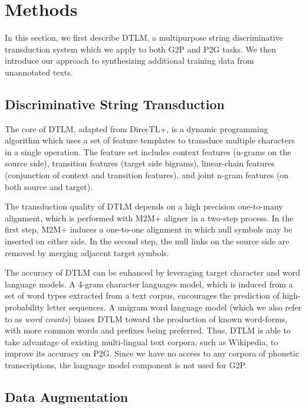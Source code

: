 \documentclass[11pt,a4paper]{article}
\begin{document}
\section{Methods}
\label{methods}

In this section, 
we first describe DTLM, %
a multipurpose string discriminative transduction system
which we apply to both G2P and P2G tasks.
We then introduce  
our approach to synthesizing additional training data
from unannotated texts.

\subsection{Discriminative String Transduction}

The core of DTLM, adapted from DirecTL+, is a dynamic programming
algorithm which uses a set of feature templates to transduce
multiple characters in a single operation. The feature set 
includes context features (n-grams on the source side), transition features
(target side bigrams), linear-chain features
(conjunction of context and transition features),
and joint n-gram features (on both source and target).

The transduction quality of DTLM depends on 
a high precision one-to-many alignment,
which is performed with M2M+ aligner \cite{jiampojamarn-etal-2007-applying}
in a two-step process. 
In the first step, M2M+ induces a one-to-one alignment %
in which null symbols may be inserted on either side.
In the second step, 
the null links on the source side are removed
by merging adjacent target symbols.

The accuracy of DTLM can be
enhanced by leveraging
target character and word language models.
A 4-gram character languages model,
which is induced from a set of word types extracted from a text corpus,
encourages the prediction of high-probability letter sequences.
A unigram word language model
(which we also refer to as {\em word counts})
biases DTLM toward the production of known word-forms,
with more common words and prefixes being preferred.
Thus, DTLM is able to take advantage of existing multi-lingual
text corpora, such as Wikipedia,
to improve its accuracy on P2G.
Since we have no access to any corpora of
phonetic transcriptions, %
the language model component is not used for G2P.


\subsection{Data Augmentation}
\label{augmentation}
\end{document}
